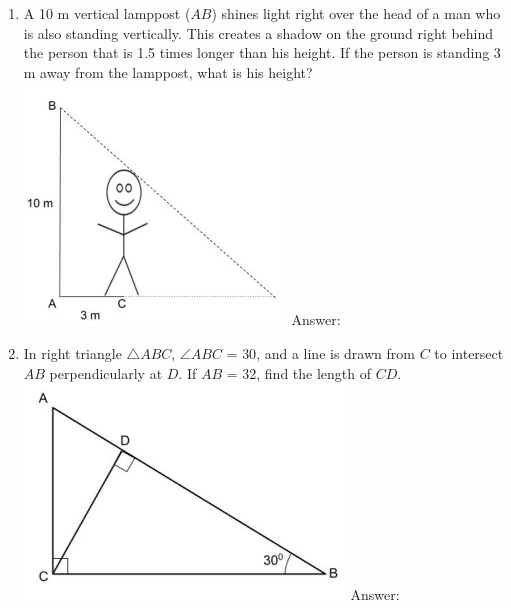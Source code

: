 \documentclass[11pt]{extarticle}
\begin{document}
\begin{enumerate}
    \item {A 10 m vertical lamppost ($AB$) shines light right over the head of a man who is also standing vertically. This creates a shadow on the ground right behind the person that is 1.5 times longer than his height. If the person is standing 3 m away from the lamppost, what is his height?\\
    \includegraphics{April_25_Q4.jpg} Answer: }
    \item {In right triangle $\bigtriangleup ABC$, $\angle ABC$ = {30\textdegree}, and a line is drawn from $C$ to intersect $AB$ perpendicularly at $D$. If $AB$ = 32, find the length of $CD$.\\
    \includegraphics{April_25_Q5.jpg} Answer: }
\end{enumerate}
\end{document}
